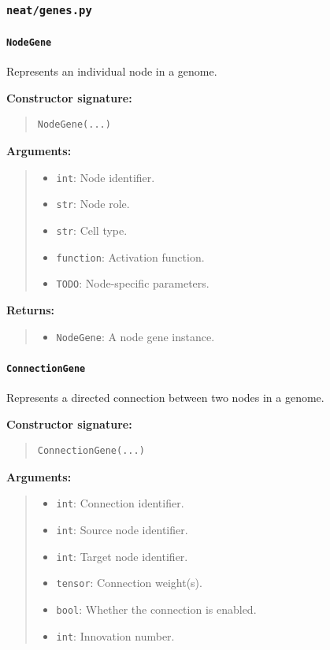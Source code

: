 \documentclass[11pt]{article}
\begin{document}
\subsubsection{\texttt{neat/genes.py}}

\paragraph{\texttt{NodeGene}}

Represents an individual node in a genome.

\textbf{Constructor signature:}
\begin{quote}
\begin{verbatim}
NodeGene(...)
\end{verbatim}
\end{quote}

\textbf{Arguments:}
\begin{quote}
\begin{itemize}
    \item \texttt{int}: Node identifier.
    \item \texttt{str}: Node role.
    \item \texttt{str}: Cell type.
    \item \texttt{function}: Activation function.
    \item \texttt{TODO}: Node-specific parameters.
\end{itemize}
\end{quote}

\textbf{Returns:}
\begin{quote}
\begin{itemize}
    \item \texttt{NodeGene}: A node gene instance.
\end{itemize}
\end{quote}

\paragraph{\texttt{ConnectionGene}}

Represents a directed connection between two nodes in a genome.

\textbf{Constructor signature:}
\begin{quote}
\begin{verbatim}
ConnectionGene(...)
\end{verbatim}
\end{quote}

\textbf{Arguments:}
\begin{quote}
\begin{itemize}
    \item \texttt{int}: Connection identifier.
    \item \texttt{int}: Source node identifier.
    \item \texttt{int}: Target node identifier.
    \item \texttt{tensor}: Connection weight(s).
    \item \texttt{bool}: Whether the connection is enabled.
    \item \texttt{int}: Innovation number.
\end{itemize}
\end{quote}
\end{document}

